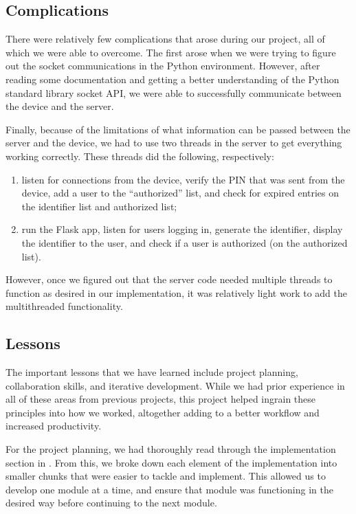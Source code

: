 \documentclass[11pt]{article}
\begin{document}
\subsection{Complications}

There were relatively few complications that arose during our project,
all of which we were able to overcome. The first arose when we were
trying to figure out the socket communications in the Python
environment. However, after reading some documentation and getting a
better understanding of the Python standard library socket API, we were
able to successfully communicate between the device and the server. 

Finally, because of the limitations of what information can be passed
between the server and the device, we had to use two threads in the
server to get everything working correctly. These threads did the
following, respectively: 
\begin{enumerate}
    \item listen for connections from the device, verify the PIN that
    was sent from the device, add a user to the ``authorized'' list, and
    check for expired entries on the identifier list and authorized
    list;
    \item run the Flask app, listen for users logging in, generate the
    identifier, display the identifier to the user, and check if a user
    is authorized (on the authorized list). 
\end{enumerate}
However, once we figured out that the server code needed multiple threads to
function as desired in our implementation, it was relatively light work
to add the multithreaded functionality. 

\subsection{Lessons}

The important lessons that we have learned include project planning,
collaboration skills, and iterative development. While we had prior
experience in all of these areas from previous projects, this project
helped ingrain these principles into how we worked, altogether adding to
a better workflow and increased productivity. 

For the project planning, we had thoroughly read through the
implementation section in \cite{shirvanian2d2fa}. From this, we 
broke down each element of the implementation into smaller chunks that
were easier to tackle and implement. This allowed us to develop one
module at a time, and ensure that module was functioning in the desired
way before continuing to the next module. 
\end{document}
